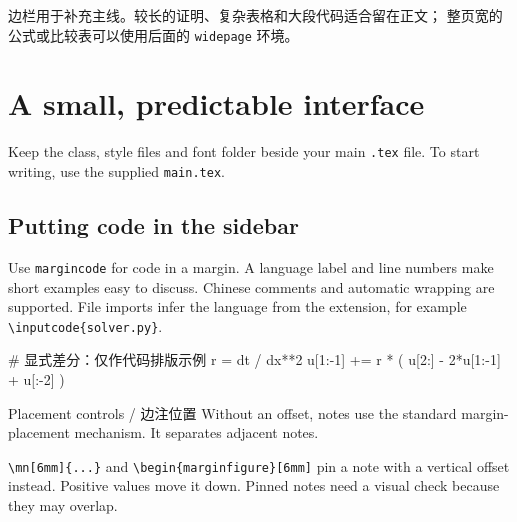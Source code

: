\begin{translationbox}
边栏用于补充主线。较长的证明、复杂表格和大段代码适合留在正文；
整页宽的公式或比较表可以使用后面的 \texttt{widepage} 环境。
\end{translationbox}

\newpage
\section{A small, predictable interface}
Keep the class, style files and font folder beside your main
\texttt{.tex} file. To start writing, use the supplied \texttt{main.tex}.


\subsection{Putting code in the sidebar}
Use \verb|margincode| for code in a margin. A language label and line
numbers make short examples easy to discuss. Chinese comments and
automatic wrapping are supported. File imports infer the language from
the extension, for example \verb||.
\begin{margincode}[language=Python,title={Heat step}]
# 显式差分：仅作代码排版示例
r = dt / dx**2
u[1:-1] += r * (
    u[2:] - 2*u[1:-1] + u[:-2]
)
\end{margincode}

\begin{notebox}{Placement controls / 边注位置}
Without an offset, notes use the standard margin-placement mechanism.
It separates adjacent notes.\par
\verb|| and \verb|\begin{marginfigure}[6mm]| pin a note
with a vertical offset instead. Positive values move it down.
Pinned notes need a visual check because they may overlap.
\end{notebox}


